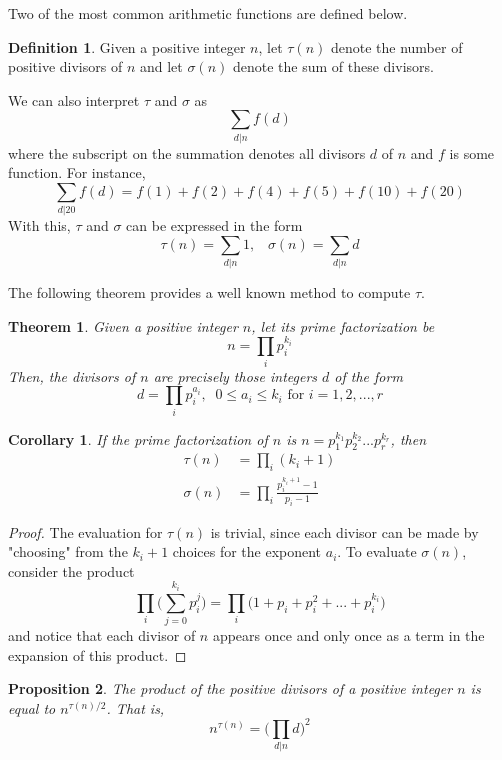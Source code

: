 \documentclass{article}
\newtheorem{theorem}{Theorem}[section]
\newtheorem{proposition}[theorem]{Proposition}
\newtheorem{corollary}{Corollary}[theorem]
\theoremstyle{remark}
\theoremstyle{definition}
\newtheorem{definition}{Definition}[section]
\begin{document}
Two of the most common arithmetic functions are defined below. 

\begin{definition}
Given a positive integer $n$, let $\tau(n)$ denote the number of positive divisors of $n$ and let $\sigma(n)$ denote the sum of these divisors. 

We can also interpret $\tau$ and $\sigma$ as 
\[\sum_{d|n} f(d)\]
where the subscript on the summation denotes all divisors $d$ of $n$ and $f$ is some function. For instance,
\[\sum_{d|20} f(d) = f(1) + f(2) + f(4) + f(5) + f(10) + f(20)\]
With this, $\tau$ and $\sigma$ can be expressed in the form 
\[\tau(n) = \sum_{d|n} 1, \;\;\; \sigma(n) = \sum_{d|n} d\]
\end{definition}

The following theorem provides a well known method to compute $\tau$. 

\begin{theorem}
Given a positive integer $n$, let its prime factorization be 
\[n = \prod_{i} p_i^{k_i}\]
Then, the divisors of $n$ are precisely those integers $d$ of the form 
\[d = \prod_i p_i^{a_i}, \;\; 0 \leq a_i \leq k_i \text{ for } i = 1, 2, ..., r\]
\end{theorem}

\begin{corollary}
If the prime factorization of $n$ is $n = p_1^{k_1} p_2^{k_2} ... p_r^{k_r}$, then
\begin{align*}
    \tau(n) & = \prod_i (k_i + 1) \\
    \sigma(n) & = \prod_i \frac{p_i^{k_i + 1} - 1}{p_i - 1}
\end{align*}
\end{corollary}
\begin{proof}
The evaluation for $\tau(n)$ is trivial, since each divisor can be made by "choosing" from the $k_i + 1$ choices for the exponent $a_i$. To evaluate $\sigma(n)$, consider the product 
\[\prod_i \Big( \sum_{j=0}^{k_i} p_i^j \Big) = \prod_{i} \big(1 + p_i + p_i^2 + ... + p_i^{k_i}\big)\]
and notice that each divisor of $n$ appears once and only once as a term in the expansion of this product. 
\end{proof}

\begin{proposition}
The product of the positive divisors of a positive integer $n$ is equal to $n^{\tau(n)/2}$. That is, 
\[n^{\tau(n)} = \bigg( \prod_{d|n} d \bigg)^2\]
\end{proposition}
\end{document}
